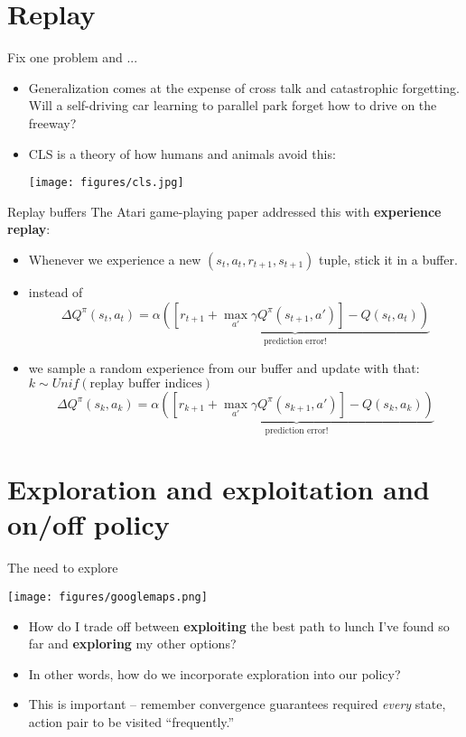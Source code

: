 \documentclass{beamer} %
\begin{document}
\section{Replay}
\begin{frame}{Fix one problem and ...}
\begin{itemize}
    \item Generalization comes at the expense of cross talk and catastrophic forgetting. Will a self-driving car learning to parallel park forget how to drive on the freeway?
    \item<2-> CLS is a theory of how humans and animals avoid this:
    \begin{center}
        \texttt{[image: figures/cls.jpg]}
    \end{center}
\end{itemize}
\end{frame}

\begin{frame}{Replay buffers}
The Atari game-playing paper addressed this with \textbf{experience replay}:
\begin{itemize}
    \item Whenever we experience a new \((s_t, a_t, r_{t+1}, s_{t+1})\) tuple, stick it in a buffer.
    \item<2-> instead of  
         {
          \[\Delta Q^{\pi}(s_{t}, a_t) = \alpha \underbrace{\left( \left[ r_{t+1} + \max_{a'} \gamma Q^{\pi}(s_{t+1}, a') \right] - Q(s_t, a_t)\right)}_{\text{prediction error!}}\]}%
    \item<3-> we sample a random experience from our buffer and update with that: \(k \sim Unif(\text{replay buffer indices})\) 
         {
          \[\Delta Q^{\pi}(s_{k}, a_k) = \alpha \underbrace{\left( \left[ r_{k+1} + \max_{a'} \gamma Q^{\pi}(s_{k+1}, a') \right] - Q(s_k, a_k)\right)}_{\text{prediction error!}}\]}


\end{itemize}
\end{frame}

\section{Exploration and exploitation and on/off policy}
\begin{frame}{The need to explore}
\begin{center}
    \texttt{[image: figures/googlemaps.png]}
\end{center}
\begin{itemize}
    \item<2-> How do I trade off between \textbf{exploiting} the best path to lunch I've found so far and \textbf{exploring} my other options?
    \item<3-> In other words, how do we incorporate exploration into our policy?
    \item<4-> This is important -- remember convergence guarantees required \emph{every} state, action pair to be visited ``frequently.''
\end{itemize}
\end{frame}
\end{document}
